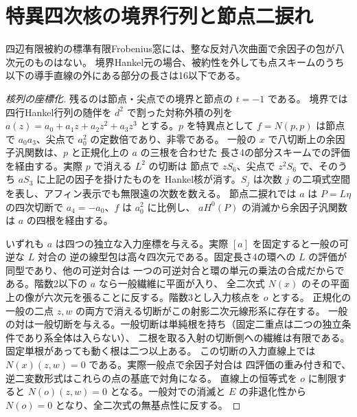 \section{特異四次核の境界行列と節点二捩れ}
\label{sec:singular-boundary-bezout}
\begin{theorem}\label{thm:singular-boundary-bezout}
四辺有限被約の標準有限Frobenius窓には、整な反対八次曲面で余因子の包が八次元のものはない。
境界Hankel元の場合、被約性を外しても点スキームのうち以下の導手直線の外にある部分の長さは16以下である。
\end{theorem}
\begin{proof}[核列の座標化]
残るのは節点・尖点での境界と節点の $t=-1$ である。
境界では四行Hankel行列の随伴を $d^2$ で割った対称外積の列を
$a(z)=a_0+a_1z+a_2z^2+a_3z^3$ とする。$p$ を特異点として
$f=N(p,p)$ は節点で $a_0a_3$、尖点で $a_0^2$ の定数倍であり、非零である。
一般の $x$ で八切断上の余因子汎関数は、$p$ と正規化上の $a$ の三根を合わせた
長さ4の部分スキームでの評価を経由する。実際 $p$ で消える $L^2$ の切断は
節点で $zS_6$、尖点で $z^2S_6$ で、そのうち $aS_3$ に上記の因子を掛けたものを
Hankel核が消す。$S_j$ は次数 $j$ の二項式空間を表し、アフィン表示でも無限遠の次数を数える。
節点二捩れでは $a$ は $P=L\eta$ の四次切断で $a_4=-a_0$、$f$ は $a_0^2$ に比例し、
$aH^0(P)$ の消滅から余因子汎関数は $a$ の四根を経由する。

いずれも $a$ は四つの独立な入力座標を与える。実際 $[a]$ を固定すると一般の可逆な $L$ 対合の
逆の線型包は高々四次元である。固定長さ4の環への $L$ の評価が同型であり、他の可逆対合は
一つの可逆対合と環の単元の乗法の合成だからである。階数2以下の $a$ なら一般繊維に平面が入り、
全二次式 $N(x)$ のその平面上の像が六次元を張ることに反する。階数3とし入力核点を $o$ とする。
正規化の一般の二点 $z,w$ の両方で消える切断がこの射影二次元線形系に存在する。
一般の対は一般切断を与える。一般切断は単純根を持ち（固定二重点は二つの独立条件であり系全体は入らない）、
二根を取る入射の切断側への繊維は有限である。固定単根があっても動く根は二つ以上ある。
この切断の入力直線上では $N(x)(z,w)=0$ である。実際一般点で余因子対合は
四評価の重み付き和で、逆二変数形式はこれらの点の基底で対角になる。
直線上の恒等式を $o$ に制限すると $N(o)(z,w)=0$ となる。一般対での消滅と
$E$ の非退化性から $N(o)=0$ となり、全二次式の無基点性に反する。
\end{proof}

